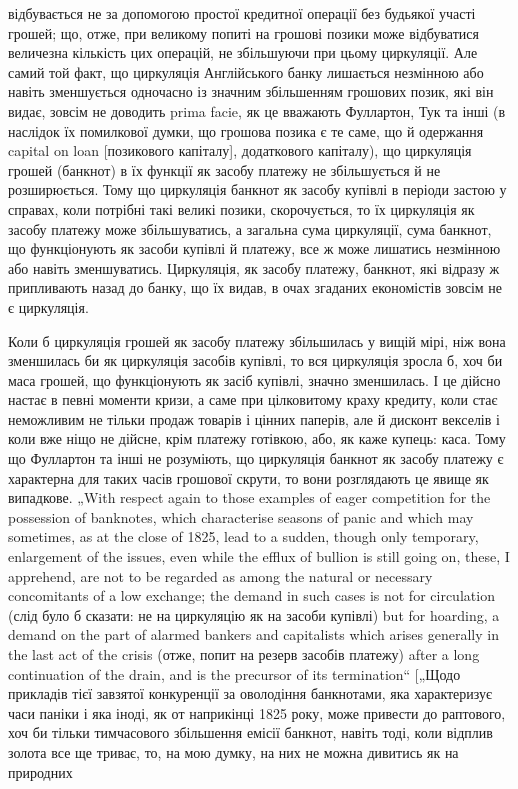 відбувається не за допомогою простої кредитної операції без
будьякої участі грошей; що, отже, при великому попиті на грошові
позики може відбуватися величезна кількість цих операцій,
не збільшуючи при цьому циркуляції. Але самий той факт,
що циркуляція Англійського банку лишається незмінною або
навіть зменшується одночасно із значним збільшенням грошових
позик, які він видає, зовсім не доводить prima facie,
як це вважають Фуллартон, Тук та інші (в наслідок їх
помилкової думки, що грошова позика є те саме, що й одержання
capital on loan [позикового капіталу], додаткового капіталу), що
циркуляція грошей (банкнот) в їх функції як засобу платежу
не збільшується й не розширюється. Тому що циркуляція банкнот
як засобу купівлі в періоди застою у справах, коли потрібні такі
великі позики, скорочується, то їх циркуляція як засобу платежу
може збільшуватись, а загальна сума циркуляції, сума банкнот,
що функціонують як засоби купівлі й платежу, все ж може
лишатись незмінною або навіть зменшуватись. Циркуляція, як
засобу платежу, банкнот, які відразу ж припливають назад до
банку, що їх видав, в очах згаданих економістів зовсім не є
циркуляція.

Коли б циркуляція грошей як засобу платежу збільшилась
у вищій мірі, ніж вона зменшилась би як циркуляція засобів
купівлі, то вся циркуляція зросла б, хоч би маса грошей,
що функціонують як засіб купівлі, значно зменшилась. І це
дійсно настає в певні моменти кризи, а саме при цілковитому
краху кредиту, коли стає неможливим не тільки продаж товарів
і цінних паперів, але й дисконт векселів і коли вже ніщо не
дійсне, крім платежу готівкою, або, як каже купець: каса. Тому
що Фуллартон та інші не розуміють, що циркуляція банкнот як
засобу платежу є характерна для таких часів грошової скрути,
то вони розглядають це явище як випадкове. „With respect again
to those examples of eager competition for the possession of banknotes,
which characterise seasons of panic and which may sometimes,
as at the close of 1825, lead to a sudden, though only temporary,
enlargement of the issues, even while the efflux of bullion
is still going on, these, I apprehend, are not to be regarded as
among the natural or necessary concomitants of a low exchange; the
demand in such cases is not for circulation (слід було б сказати:
не на циркуляцію як на засоби купівлі) but for hoarding, a demand
on the part of alarmed bankers and capitalists which arises
generally in the last act of the crisis (отже, попит на резерв засобів
платежу) after a long continuation of the drain, and is the
precursor of its termination“ [„Щодо прикладів тієї завзятої конкуренції
за оволодіння банкнотами, яка характеризує часи
паніки і яка іноді, як от наприкінці 1825 року, може привести
до раптового, хоч би тільки тимчасового збільшення
емісії банкнот, навіть тоді, коли відплив золота все ще триває,
то, на мою думку, на них не можна дивитись як на природних
